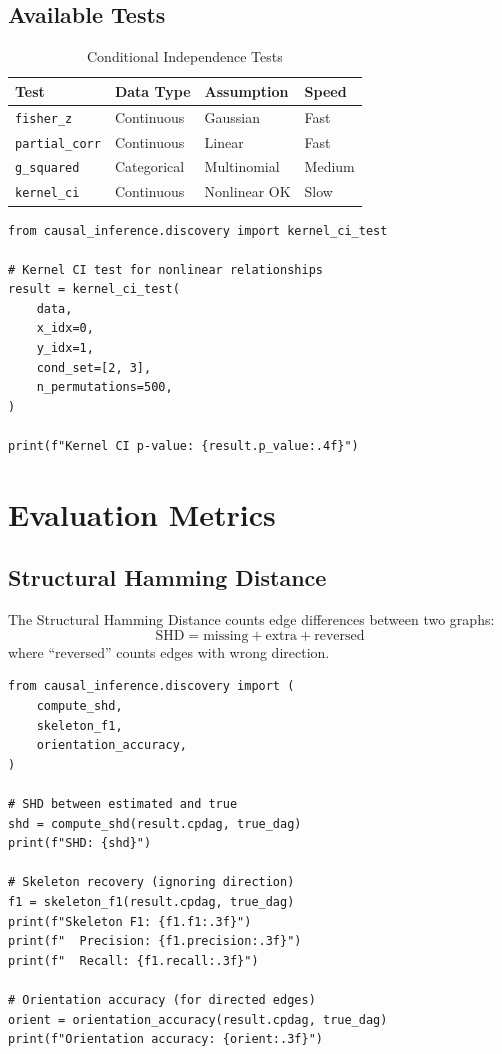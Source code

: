 \subsection{Available Tests}

\begin{table}[h]
\centering
\caption{Conditional Independence Tests}
\begin{tabular}{llll}
\toprule
Test & Data Type & Assumption & Speed \\
\midrule
\texttt{fisher\_z} & Continuous & Gaussian & Fast \\
\texttt{partial\_corr} & Continuous & Linear & Fast \\
\texttt{g\_squared} & Categorical & Multinomial & Medium \\
\texttt{kernel\_ci} & Continuous & Nonlinear OK & Slow \\
\bottomrule
\end{tabular}
\end{table}

\begin{verbatim}
from causal_inference.discovery import kernel_ci_test

# Kernel CI test for nonlinear relationships
result = kernel_ci_test(
    data,
    x_idx=0,
    y_idx=1,
    cond_set=[2, 3],
    n_permutations=500,
)

print(f"Kernel CI p-value: {result.p_value:.4f}")
\end{verbatim}


\section{Evaluation Metrics}

\subsection{Structural Hamming Distance}

\begin{definition}[SHD]
The Structural Hamming Distance counts edge differences between two graphs:
\begin{equation}
\text{SHD} = \text{missing} + \text{extra} + \text{reversed}
\end{equation}
where ``reversed'' counts edges with wrong direction.
\end{definition}

\begin{verbatim}
from causal_inference.discovery import (
    compute_shd,
    skeleton_f1,
    orientation_accuracy,
)

# SHD between estimated and true
shd = compute_shd(result.cpdag, true_dag)
print(f"SHD: {shd}")

# Skeleton recovery (ignoring direction)
f1 = skeleton_f1(result.cpdag, true_dag)
print(f"Skeleton F1: {f1.f1:.3f}")
print(f"  Precision: {f1.precision:.3f}")
print(f"  Recall: {f1.recall:.3f}")

# Orientation accuracy (for directed edges)
orient = orientation_accuracy(result.cpdag, true_dag)
print(f"Orientation accuracy: {orient:.3f}")
\end{verbatim}

